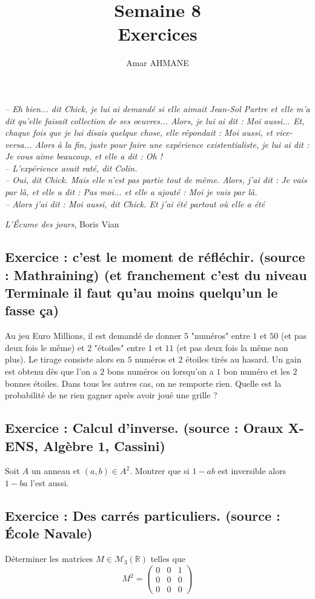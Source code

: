 \documentclass[17pt]{article}
\title{Semaine 8\\ Exercices}
\author{Amar AHMANE}
\def\R{\mathbb R}
\begin{document}
	\maketitle
	\begin{flushleft}
		\textit{– Eh bien... dit Chick, je lui ai demandé si elle aimait Jean-Sol Partre et elle m'a dit qu'elle faisait collection de ses oeuvres... Alors, je lui ai dit : Moi aussi... Et, chaque fois que je lui disais quelque chose, elle répondait : Moi aussi, et vice-versa... Alors à la fin, juste pour faire une expérience existentialiste, je lui ai dit : Je vous aime beaucoup, et elle a dit : Oh !}\\
		\textit{– L'expérience avait raté, dit Colin.}\\
		\textit{– Oui, dit Chick. Mais elle n'est pas partie tout de même. Alors, j'ai dit : Je vais par là, et elle a dit : Pas moi... et elle a ajouté : Moi je vais par là.}\\
		\textit{– Alors j'ai dit : Moi aussi, dit Chick. Et j'ai été partout où elle a été}
	\end{flushleft}
	\begin{flushright}
		\textit{L'Écume des jours}, Boris Vian
	\end{flushright}
	\subsection*{Exercice : c'est le moment de réfléchir. (source : Mathraining) (et franchement c'est du niveau Terminale il faut qu'au moins quelqu'un le fasse ça)}
	Au jeu Euro Millions, il est demandé de donner $5$ "numéros" entre $1$ et $50$ (et pas deux fois le même) et $2$ "étoiles" entre $1$ et $11$ (et pas deux fois la même non plus). Le tirage consiste alors en $5$ numéros et $2$ étoiles tirés au hasard. Un gain est obtenu dès que l'on a $2$ bons numéros ou lorsqu'on a $1$ bon numéro et les $2$ bonnes étoiles. Dans tous les autres cas, on ne remporte rien. Quelle est la probabilité de ne rien gagner après avoir joué une grille ?
	\subsection*{Exercice : Calcul d'inverse. (source : Oraux X-ENS, Algèbre 1, Cassini)}
	Soit $A$ un anneau et $(a,b)\in A^2$. Montrer que si $1-ab$ est inversible alors $1-ba$ l'est aussi.
	\subsection*{Exercice : Des carrés particuliers. (source : École Navale)}
	Déterminer les matrices $M\in\mathcal M_3(\R)$ telles que \[M^2=\begin{pmatrix}0&0&1\\0&0&0\\0&0&0 \end{pmatrix}\]
\end{document}
